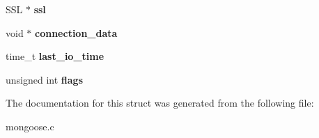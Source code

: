\begin{DoxyCompactItemize}
\item 
\hypertarget{structns__connection_a05f3d0c665984d93dd4e8ef7e0c88c88}{S\-S\-L $\ast$ {\bfseries ssl}}\label{structns__connection_a05f3d0c665984d93dd4e8ef7e0c88c88}

\item 
\hypertarget{structns__connection_ace2bc6e8bbec85302ee8ab9351fe8932}{void $\ast$ {\bfseries connection\-\_\-data}}\label{structns__connection_ace2bc6e8bbec85302ee8ab9351fe8932}

\item 
\hypertarget{structns__connection_ac9c1c38e7d8a3b1a21d361ee61683b20}{time\-\_\-t {\bfseries last\-\_\-io\-\_\-time}}\label{structns__connection_ac9c1c38e7d8a3b1a21d361ee61683b20}

\item 
\hypertarget{structns__connection_ac096ae7a3121c09aa68b36dcef2e4116}{unsigned int {\bfseries flags}}\label{structns__connection_ac096ae7a3121c09aa68b36dcef2e4116}

\end{DoxyCompactItemize}


The documentation for this struct was generated from the following file\-:\begin{DoxyCompactItemize}
\item 
mongoose.\-c\end{DoxyCompactItemize}
